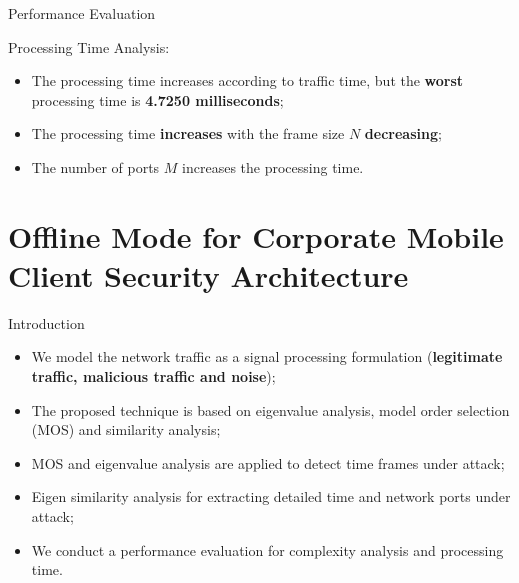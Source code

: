\documentclass[newPxFont, numfooter, sectionpages]{beamer}
\begin{document}
\begin{frame}{Performance Evaluation}

	Processing Time Analysis:
	\begin{itemize}
		\item The processing time increases according to traffic time, but the \textbf{worst} processing time is \textbf{4.7250 milliseconds};
		\item The processing time \textbf{increases} with the frame size $N$ \textbf{decreasing};
		\item The number of ports $M$ increases the processing time.
	\end{itemize}
	
\end{frame}


\section{Offline Mode for Corporate Mobile Client Security Architecture}
\label{Blocks}
\begin{frame}[c]{Introduction}
	\begin{itemize}
		\item We model the network traffic as a signal processing formulation (\textbf{legitimate traffic, malicious traffic and noise});
		\item The proposed technique is based on eigenvalue analysis, model order selection (MOS) and similarity analysis;
		\item MOS and eigenvalue analysis are applied to detect time frames under attack;
		\item Eigen similarity analysis for extracting detailed time and network ports under attack;
		\item We conduct a performance evaluation for complexity analysis and processing time.
	\end{itemize}
\end{frame}

%
%
\end{document}
